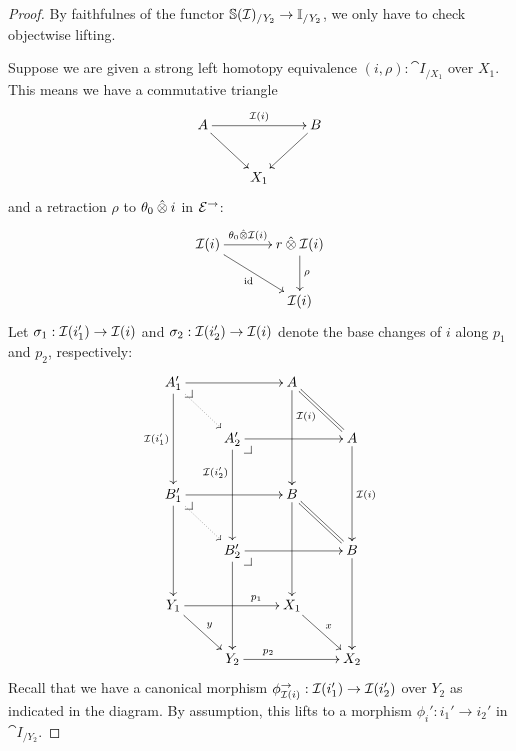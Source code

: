 \documentclass[reqno,10pt,a4paper,oneside]{amsart}
\begin{document}
\begin{proof}
By faithfulnes of the functor $\cat{S}(\cal{I})_{/Y_2} \to \cat{I}_{/Y_2}$, we only have to check objectwise lifting.

Suppose we are given a strong left homotopy equivalence $(i, \rho) : \cat{I}_{/X_1}$ over $X_1$.
This means we have a commutative triangle
\[
\xymatrix{
  A
  \ar[rr]^{\cal{I}(i)}
  \ar[dr]
&&
  B
  \ar[dl]
\\&
  X_1
}
\]
and a retraction $\rho$ to $\thetal \hatotimes i$ in $\catE^{\to}$:
\[
\xymatrix@C+1em{
  \cal{I}(i)
  \ar[r]^-{\thetal \hatotimes \cal{I}(i)}
  \ar[dr]_{\id}
&
  \intervalr \hatotimes \cal{I}(i) \ar[d]^{\rho}
\\&
  \cal{I}(i)
}
\]
Let $\sigma_1 : \cal{I}(i_1') \to \cal{I}(i)$ and $\sigma_2 : \cal{I}(i_2') \to \cal{I}(i)$ denote the base changes of $i$ along $p_1$ and $p_2$, respectively:
\[
\xymatrix{
  A_1'
  \ar[rr]
  \ar[dd]_{\cal{I}(i_1')}
  \pullback{dr}
  \ar@{.>}[dr]
&&
  A
  \ar[dd]^(0.3){\cal{I}(i)}
  \ar@{=}[dr]
\\&
  A_2'
  \ar[rr]
  \ar[dd]_(0.3){\cal{I}(i_2')}
  \pullback{dr}
&&
  A
  \ar[dd]^{\cal{I}(i)}
\\
  B_1'
  \ar[rr]
  \ar[dd]
  \pullback{dr}
  \ar@{.>}[dr]
&&
  B
  \ar[dd]
  \ar@{=}[dr]
\\&
  B_2'
  \ar[rr]
  \ar[dd]
  \pullback{dr}
&&
  B
  \ar[dd]
\\
  Y_1
  \ar[rr]^(0.7){p_1}
  \ar[dr]^{y}
&&
  X_1
  \ar[dr]^{x}
\\&
  Y_2
  \ar[rr]^(0.3){p_2}
&&
  X_2
}
\]
Recall that we have a canonical morphism $\phi_{\cal{I}(i)}^{\to} : \cal{I}(i_1') \to \cal{I}(i_2')$ over $Y_2$ as indicated in the diagram.
By assumption, this lifts to a morphism $\phi_i' : i_1' \to i_2'$ in $\cat{I}_{/Y_2}$.


\end{proof}
\end{document}
